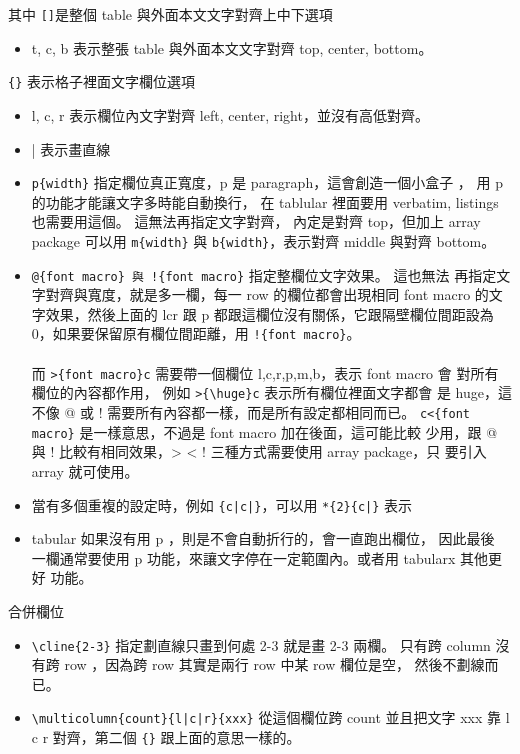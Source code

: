   其中 \verb=[]=是整個 table 與外面本文文字對齊上中下選項
  \begin{itemize}
    \item t, c, b 表示整張 table 與外面本文文字對齊 top, center, bottom。
  \end{itemize}
  \verb={}= 表示格子裡面文字欄位選項
  \begin{itemize}
    \item l, c, r 表示欄位內文字對齊 left, center, right，並沒有高低對齊。
    \item | 表示畫直線
    \item \verb=p{width}= 指定欄位真正寬度，p 是 paragraph，這會創造一個小盒子
      ， 用 p 的功能才能讓文字多時能自動換行， 在 tablular 裡面要用 verbatim,
      listings 也需要用這個。 這無法再指定文字對齊， 內定是對齊 top，但加上
      array package 可以用 \verb=m{width}= 與 \verb=b{width}=，表示對齊 middle
      與對齊 bottom。
    \item \verb=@{font macro} 與 !{font macro}= 指定整欄位文字效果。 這也無法
      再指定文字對齊與寬度，就是多一欄，每一 row 的欄位都會出現相同 font macro
      的文字效果，然後上面的 lcr 跟 p 都跟這欄位沒有關係，它跟隔壁欄位間距設為
      0，如果要保留原有欄位間距離，用 \verb=!{font macro}=。
      \\\\
      而 \verb=>{font macro}c= 需要帶一個欄位 l,c,r,p,m,b，表示 font macro 會
      對所有欄位的內容都作用， 例如 \verb=>{\huge}c= 表示所有欄位裡面文字都會
      是 huge，這不像 @ 或 !  需要所有內容都一樣，而是所有設定都相同而已。
      \verb=c<{font macro}= 是一樣意思，不過是 font macro 加在後面，這可能比較
      少用，跟 @ 與 ! 比較有相同效果，> < ! 三種方式需要使用 array package，只
      要引入 array 就可使用。
    \item 當有多個重複的設定時，例如 \verb={c|c|}=，可以用 \verb=*{2}{c|}= 表示
    \item tabular 如果沒有用 p ，則是不會自動折行的，會一直跑出欄位， 因此最後
      一欄通常要使用 p 功能，來讓文字停在一定範圍內。或者用 tabularx 其他更好
      功能。
  \end{itemize}
  合併欄位
  \begin{itemize}
    \item \verb=\cline{2-3}= 指定劃直線只畫到何處 2-{}3 就是畫 2-{}3 兩欄。
      只有跨 column 沒有跨 row ，因為跨 row 其實是兩行 row 中某 row 欄位是空，
      然後不劃線而已。
    \item \verb=\multicolumn{count}{l|c|r}{xxx}= 從這個欄位跨 count 並且把文字
      xxx 靠 l c r 對齊，第二個 \verb={}= 跟上面的意思一樣的。
  \end{itemize}

